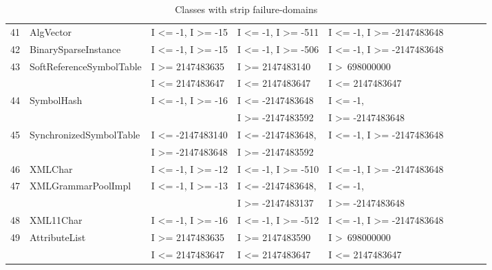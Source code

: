 \documentclass[runningheads,a4paper]{llncs}
\begin{document}
\begin{table}[h]
{{\begin{tabular}{|l|l|l|l|l|l|l|l|l|}
41	& AlgVector					& I \textless= -1, I \textgreater= -15			& I \textless= -1, I \textgreater= -511		& I \textless= -1, I \textgreater= -2147483648	\\ 
42	& BinarySparseInstance		& I \textless= -1, I \textgreater= -15			& I \textless= -1, I \textgreater= -506		& I \textless= -1, I \textgreater= -2147483648	\\ 
43	& SoftReferenceSymbolTable	& I \textgreater= 2147483635				& I \textgreater= 2147483140			& I \textgreater~698000000					\\ 
	&                                             & I \textless= 2147483647					& I \textless= 2147483647				&  I \textless= 2147483647					\\	
44	& SymbolHash				& I \textless= -1,  I \textgreater= -16			& I \textless= -2147483648			 	& I \textless= -1, 							\\ 
	&							&											& I \textgreater= -2147483592			& I \textgreater= -2147483648				\\
45	& SynchronizedSymbolTable	& I \textless= -2147483140					& I \textless= -2147483648,				& I \textless= -1, I \textgreater= -2147483648	\\ 
	&                                             & I \textgreater= -2147483648				&  I \textgreater= -2147483592			&  			   								\\
46	& XMLChar					& I \textless= -1, I \textgreater= -12			& I \textless= -1, I \textgreater= -510		& I \textless= -1, I \textgreater= -2147483648	\\
47	& XMLGrammarPoolImpl		& I \textless= -1, I \textgreater= -13			& I \textless= -2147483648, 				& I \textless= -1, 							\\ 
	&							&											& I \textgreater= -2147483137			& I \textgreater= -2147483648				\\
48	& XML11Char				& I \textless= -1, I \textgreater= -16			& I \textless= -1, I \textgreater= -512		& I \textless= -1, I \textgreater= -2147483648	\\ 
49	& AttributeList				& I \textgreater= 2147483635				& I \textgreater= 2147483590			& I \textgreater~698000000					\\ 
	&                                             & I \textless= 2147483647					& I \textless= 2147483647				&  I \textless= 2147483647					\\	

\hline
\end{tabular}
}
}
\bigskip
\caption{Classes with strip failure-domains}
\label{table:stripDomains}
\end{table}
\end{document}

